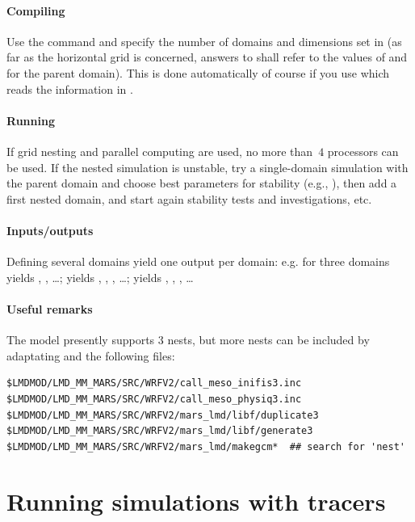 \paragraph{Compiling} Use the command  and specify the number of domains and dimensions set in  (as far as the horizontal grid is concerned, answers to  shall refer to the values of  and  for the parent domain). This is done automatically of course if you use  which reads the information in .

\paragraph{Running} If grid nesting and parallel computing are used, no more than~$4$ processors can be used. If the nested simulation is unstable, try a single-domain simulation with the parent domain and choose best parameters for stability (e.g., ), then add a first nested domain, and start again stability tests and investigations, etc.

\paragraph{Inputs/outputs} Defining several domains yield one output per domain: e.g. for three domains  yields , , \ldots;  yields , , , \ldots;  yields , , , \ldots   

\paragraph{Useful remarks} The model presently supports 3 nests, but more nests can be included by adaptating  and the following files: 
\begin{verbatim}
$LMDMOD/LMD_MM_MARS/SRC/WRFV2/call_meso_inifis3.inc
$LMDMOD/LMD_MM_MARS/SRC/WRFV2/call_meso_physiq3.inc
$LMDMOD/LMD_MM_MARS/SRC/WRFV2/mars_lmd/libf/duplicate3
$LMDMOD/LMD_MM_MARS/SRC/WRFV2/mars_lmd/libf/generate3
$LMDMOD/LMD_MM_MARS/SRC/WRFV2/mars_lmd/makegcm*  ## search for 'nest'
\end{verbatim}

\mk
\section{Running simulations with tracers}


